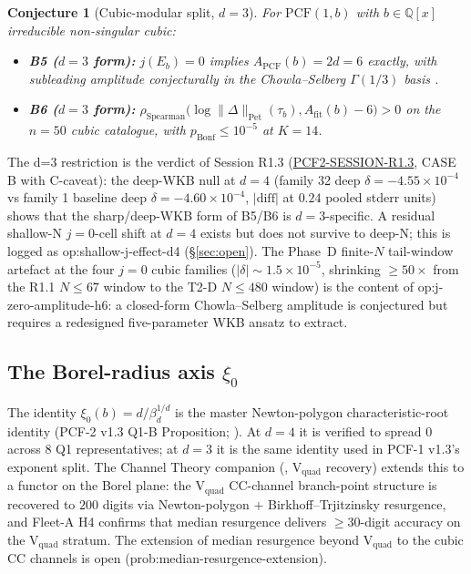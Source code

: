 \documentclass[11pt,a4paper]{article}
\newtheorem{conjecture}{Conjecture}
\theoremstyle{definition}
\theoremstyle{remark}
\newcommand{\PCF}{\mathrm{PCF}}
\newcommand{\Q}{\mathbb{Q}}
\newcommand{\PetN}[1]{\lVert #1 \rVert_{\mathrm{Pet}}}
\begin{document}
\begin{conjecture}[Cubic-modular split, $d=3$]
\label{conj:b5-b6-d3}
For $\PCF(1,b)$ with $b \in \Q[x]$ irreducible non-singular cubic:
\begin{itemize}[leftmargin=2em]
  \item \textbf{B5 ($d=3$ form):} $j(E_b) = 0$ implies
    $A_{\mathrm{PCF}}(b) = 2d = 6$ exactly, with subleading
    amplitude conjecturally in the Chowla--Selberg
    $\Gamma(1/3)$ basis \cite{ChowlaSelberg1967}.
  \item \textbf{B6 ($d=3$ form):}
    $\rho_{\mathrm{Spearman}}\bigl(\log\PetN{\Delta}(\tau_b),
    A_{\mathrm{fit}}(b) - 6\bigr) > 0$ on the $n=50$ cubic catalogue,
    with $p_{\mathrm{Bonf}} \leq 10^{-5}$ at $K=14$.
\end{itemize}
\end{conjecture}

The d=3 restriction is the verdict of Session R1.3
(\href{https://github.com/papanokechi/siarc-relay-bridge/tree/main/sessions/2026-05-01/PCF2-SESSION-R1.3/}{PCF2-SESSION-R1.3},
\textsf{CASE B with C-caveat}): the deep-WKB null at $d=4$
(family 32 deep $\delta = -4.55\times 10^{-4}$ vs family 1 baseline
deep $\delta = -4.60\times 10^{-4}$, $|\mathrm{diff}|$ at $0.24$
pooled stderr units) shows that the sharp/deep-WKB form of B5/B6 is
$d=3$-specific. A residual shallow-N $j=0$-cell shift at $d=4$
exists but does not survive to deep-N; this is logged as
\textsf{op:shallow-j-effect-d4} (\S\ref{sec:open}). The Phase~D
finite-$N$ tail-window artefact at the four $j=0$ cubic families
($|\delta| \sim 1.5\times 10^{-5}$, shrinking $\geq 50\times$ from
the R1.1 $N \leq 67$ window to the T2-D $N \leq 480$ window) is the
content of \textsf{op:j-zero-amplitude-h6}: a closed-form
Chowla--Selberg amplitude is conjectured but requires a redesigned
five-parameter WKB ansatz to extract.

\subsection{The Borel-radius axis \texorpdfstring{$\xi_0$}{xi\_0}}
\label{sec:triple-borel}

The identity $\xi_0(b) = d/\beta_d^{1/d}$ is the master Newton-polygon
characteristic-root identity (PCF-2 v1.3 Q1-B Proposition; \cite{PCF2}).
At $d=4$ it is verified to spread $0$ across $8$ Q1 representatives;
at $d=3$ it is the same identity used in PCF-1 v1.3's exponent split.
The Channel Theory companion (\cite{CT}, V$_{\mathrm{quad}}$ recovery)
extends this to a functor on the Borel plane: the V$_{\mathrm{quad}}$
CC-channel branch-point structure is recovered to $200$ digits via
Newton-polygon $+$ Birkhoff--Trjitzinsky resurgence, and Fleet-A H4
confirms that median resurgence delivers $\geq 30$-digit accuracy on
the V$_{\mathrm{quad}}$ stratum. The extension of median resurgence
beyond V$_{\mathrm{quad}}$ to the cubic CC channels is open
(\textsf{prob:median-resurgence-extension}).
\end{document}
